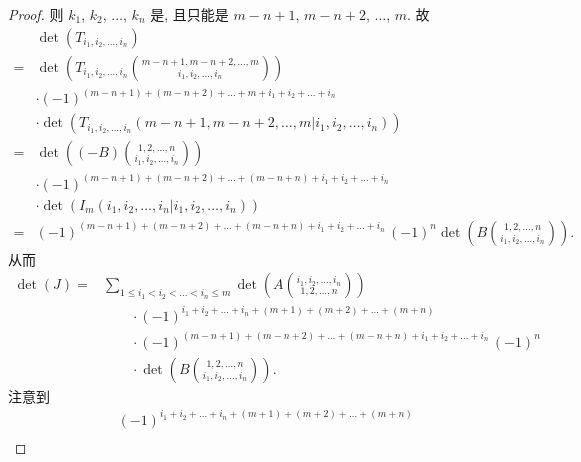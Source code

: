 \documentclass[%
    UTF8,%
    fontset=none,%
    punct=kaiming,%
    zihao=-4,%
    a4paper,%
    oneside,%
]{ctexbook}
\renewcommand*{\leq}{\leqslant}
\begin{document}
\begin{proof}
    则 \(k_1\), \(k_2\), \(\dots\), \(k_n\)
    是, 且只能是
    \(m-n+1\), \(m-n+2\), \(\dots\), \(m\).
    故
    \begin{align*}
             & \det {(T_{i_1,i_2,\dots,i_n})}
        \\
        = {} &
        \det {\left(
            T_{i_1,i_2,\dots,i_n}
            \binom{m-n+1,m-n+2,\dots,m}{i_1,i_2,\dots,i_n}
            \right)}
        \\
             &
        \cdot (-1)^{(m-n+1) + (m-n+2) + \dots + m
            + i_1 + i_2 + \dots + i_n}
        \\
             &
        \cdot
        \det {(T_{i_1,i_2,\dots,i_n}
        ({m-n+1,m-n+2,\dots,m}|{i_1,i_2,\dots,i_n}))}
        \\
        = {} &
        \det {\left(
            (-B)
            \binom{1,2,\dots,n}{i_1,i_2,\dots,i_n}
            \right)}
        \\
             & \cdot
        (-1)^{(m-n+1) + (m-n+2) + \dots + (m-n+n)
            + i_1 + i_2 + \dots + i_n}
        \\
             & \cdot
        \det {(I_m
        ({i_1,i_2,\dots,i_n}|{i_1,i_2,\dots,i_n}))}
        \\
        = {} &
        (-1)^{(m-n+1) + (m-n+2) + \dots + (m-n+n)
                + i_1 + i_2 + \dots + i_n}\,
        (-1)^n
        \det {\left(
            B
            \binom{1,2,\dots,n}{i_1,i_2,\dots,i_n}
            \right)}.
    \end{align*}
    从而
    \begin{align*}
        \det {(J)}
        = {} & \sum_{1 \leq i_1 < i_2 < \dots < i_n \leq m}
        {\det {\left(
                A\binom{i_1,i_2,\dots,i_n}{1,2,\dots,n}
                \right)}}
        \\
             & \qquad
        \cdot
        (-1)^{i_1 + i_2 + \dots + i_n
            + (m+1) + (m+2) + \dots + (m+n)}
        \\
             & \qquad
        \cdot
        (-1)^{(m-n+1) + (m-n+2) + \dots + (m-n+n)
            + i_1 + i_2 + \dots + i_n}\, (-1)^n
        \\
             & \qquad
        \cdot
        \det {\left(
            B
            \binom{1,2,\dots,n}{i_1,i_2,\dots,i_n}
            \right)}.
    \end{align*}
    注意到
    \begin{align*}
             &
        (-1)^{i_1 + i_2 + \dots + i_n
                + (m+1) + (m+2) + \dots + (m+n)}
        \\

\end{align*}
\end{proof}
\end{document}
